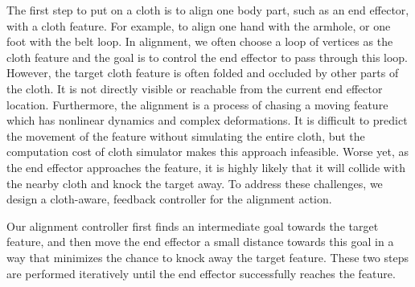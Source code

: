 The first step to put on a cloth is to align one body part, such as an end effector, with a cloth feature. For example, to align one hand with the armhole, or one foot with the belt loop. In alignment, we often choose a loop of vertices as the cloth feature and the goal is to control the end effector to pass through this loop. However, the target cloth feature is often folded and occluded by other parts of the cloth. It is not directly visible or reachable from the current end effector location. Furthermore, the alignment is a process of chasing a moving feature which has nonlinear dynamics and complex deformations. It is difficult to predict the movement of the feature without simulating the entire cloth, but the computation cost of cloth simulator makes this approach infeasible. Worse yet, as the end effector approaches the feature, it is highly likely that it will collide with the nearby cloth and knock the target away.  To address these challenges, we design a cloth-aware, feedback controller for the alignment action.

Our alignment controller first finds an intermediate goal towards the target feature, and then move the end effector a small distance towards this goal in a way that minimizes the chance to knock away the target feature. These two steps are performed iteratively until the end effector successfully reaches the feature. 


